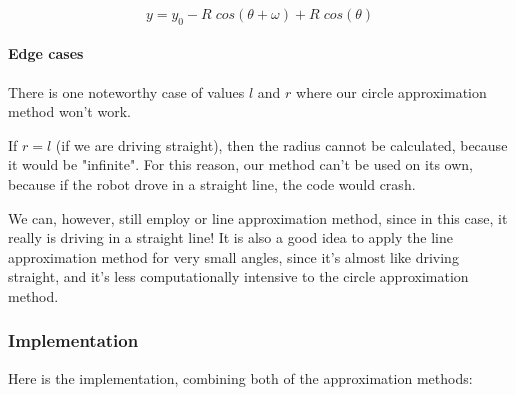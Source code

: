 \documentclass[12pt,twoside]{article}
\let\subsubsubsection\paragraph
\begin{document}
\vspace{-\parskip}\[y = y_0 - R \; cos(\theta + \omega) + R \; cos(\theta)\]


\subsubsubsection{Edge cases}
There is one noteworthy case of values $l$ and $r$ where our circle approximation method won't work.

If $r=l$ (if we are driving straight), then the radius cannot be calculated, because it would be "infinite". For this reason, our method can't be used on its own, because if the robot drove in a straight line, the code would crash.

We can, however, still employ or line approximation method, since in this case, it really is driving in a straight line! It is also a good idea to apply the line approximation method for very small angles, since it's almost like driving straight, and it's less computationally intensive to the circle approximation method.


\subsubsection{Implementation}
Here is the implementation, combining both of the approximation methods:
\end{document}
